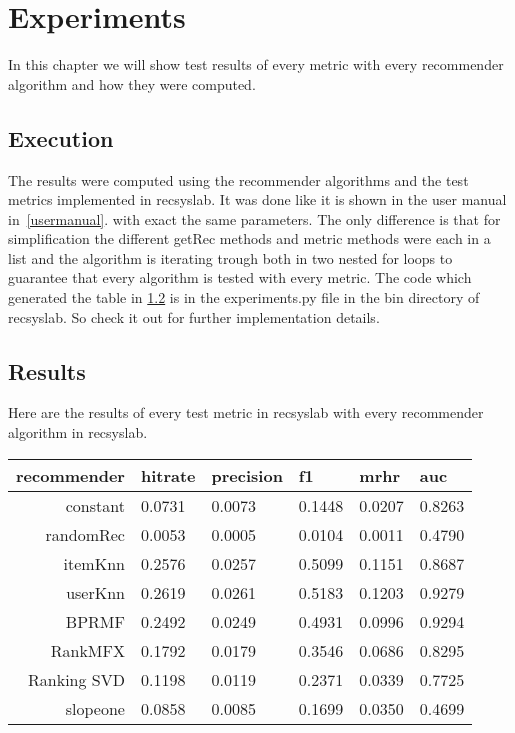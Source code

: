 \chapter{Experiments}
\label{experiments}
In this chapter we will show test results of every metric with every
recommender algorithm and how they were computed.


\section{Execution}
The results were computed using the recommender algorithms and 
the test metrics implemented in recsyslab. It was done 
like it is shown in the user manual in~\ref{usermanual}.
with exact the same parameters.
The only difference is that for simplification the different
getRec methods and metric methods were each in a list and the 
algorithm is iterating trough both in two nested for loops
to guarantee that every algorithm is tested with every metric.
The code which generated the table in \ref{results} is in 
the experiments.py file in the bin directory of recsyslab.
So check it out for further implementation details.


\section{Results}
\label{results}
Here are the results of every test metric in recsyslab
with every recommender algorithm in recsyslab.

\vspace{1.5 mm}
\begin{tabular}{rlllll}
    recommender  & hitrate & precision & f1 & mrhr & auc \\ \midrule
    constant & 0.0731 & 0.0073 & 0.1448 & 0.0207 & 0.8263 \\
    randomRec & 0.0053 & 0.0005 & 0.0104 & 0.0011 & 0.4790 \\
    itemKnn & 0.2576 & 0.0257 & 0.5099 & 0.1151 & 0.8687 \\
    userKnn & 0.2619 & 0.0261 & 0.5183 & 0.1203 & 0.9279 \\
    BPRMF& 0.2492 & 0.0249 & 0.4931 & 0.0996 & 0.9294 \\
    RankMFX & 0.1792 & 0.0179 & 0.3546 & 0.0686 & 0.8295 \\
    Ranking SVD & 0.1198 & 0.0119 & 0.2371 & 0.0339 & 0.7725 \\
    slopeone & 0.0858 & 0.0085 & 0.1699 & 0.0350 & 0.4699 \\ \bottomrule
\end{tabular}

